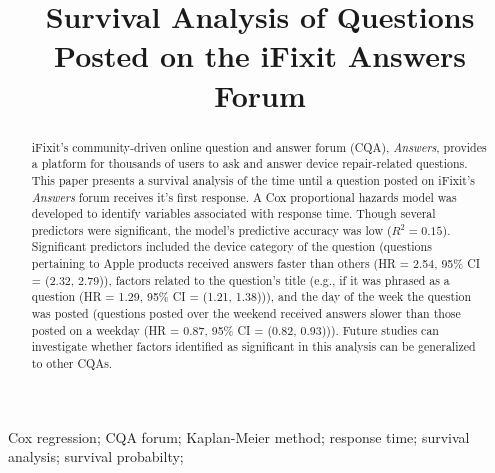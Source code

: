 \documentclass[]{interact}\usepackage[]{graphicx}\usepackage[]{color}
\begin{document}
\makeatletter
\DeclareRobustCommand\bfseries{%
  \not@math@alphabet\bfseries\mathbf
  \fontseries\bfdefault\selectfont
  \boldmath %
}
\makeatother

\makeatletter %
\@fpsep\textheight
\makeatother




\title{Survival Analysis of Questions Posted on the iFixit Answers Forum}

\author{
}

\maketitle

\begin{abstract} 
iFixit's community-driven online question and answer forum (CQA), \textit{Answers}, provides a platform for thousands of users to ask and answer device repair-related questions. This paper presents a survival analysis of the time until a question posted on iFixit's \textit{Answers} forum receives it's first response. A Cox proportional hazards model was developed to identify variables associated with response time. Though several predictors were significant, the model's predictive accuracy was low ($R^2 = 0.15$). Significant predictors included the device category of the question (questions pertaining to Apple products received answers faster than others (HR = 2.54, 95\% CI = (2.32, 2.79)), factors related to the question's title (e.g., if it was phrased as a question (HR = 1.29, 95\% CI = (1.21, 1.38))), and the day of the week the question was posted (questions posted over the weekend received answers slower than those posted on a weekday (HR = 0.87, 95\% CI = (0.82, 0.93))). Future studies can investigate whether factors identified as significant in this analysis can be generalized to other CQAs.
\end{abstract} %

\begin{keywords}
Cox regression; CQA forum; Kaplan-Meier method; response time; survival analysis; survival probabilty;  
\end{keywords}
\end{document}
